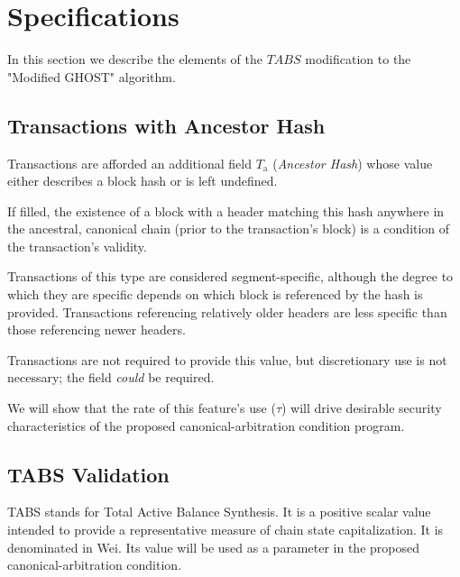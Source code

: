 \documentclass[11pt]{article}
\theoremstyle{plain}
\begin{document}
\pagebreak
\section{\normalsize{Specifications}}


In this section we describe the elements of the $TABS$ modification to the
"Modified GHOST" algorithm.

\subsection{\small{Transactions with Ancestor Hash}}\label{sec: S2.1}

Transactions are afforded an additional field $T_\mathrm{a}$ (\textit{Ancestor
Hash}) whose value either describes a block hash or is left undefined.

If filled, the existence of a block with a header matching this hash anywhere
in the ancestral, canonical chain (prior to the transaction's block) is a
condition of the transaction's validity.

Transactions of this type are considered segment-specific, although the degree
to which they are specific depends on which block is referenced by the hash is
provided.
Transactions referencing relatively older headers are less specific than those
referencing newer headers.

Transactions are not required to provide this value, but discretionary use is not 
necessary; the field \textit{could} be required.

We will show that the rate of this feature's use ($\tau$) will drive desirable
security characteristics of the proposed canonical-arbitration condition
program.


\subsection{\small{TABS Validation}}\label{sec: S3.1}

TABS stands for Total Active Balance Synthesis.
It is a positive scalar value intended to provide a representative measure of 
chain state capitalization.
It is denominated in Wei.
Its value will be used as a parameter in the proposed canonical-arbitration
condition.

\newcommand{\minTABS}{K_0}
\newcommand{\mynumerator}{y}
\newcommand{\diffadjustment}{x}
\end{document}
